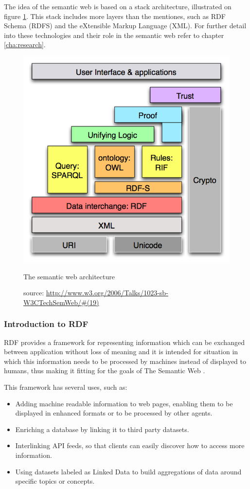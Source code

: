 The idea of the semantic web is based on a stack architecture, illustrated on figure \ref{fig:semwebstack}. This stack includes more layers than the mentiones, such as RDF Schema (RDFS) and the eXtensible Markup Language (XML). For further detail into these technologies and their role in the semantic web refer to chapter \ref{cha:research}.

\begin{figure}[ht]
  \centering
  \includegraphics[width=.5\textwidth]{fig/semwebstack}
  \caption{The semantic web architecture}
  \caption*{source: \url{http://www.w3.org/2006/Talks/1023-sb-W3CTechSemWeb/\#(19)}}
  \label{fig:semwebstack}
\end{figure} 

\subsubsection{Introduction to RDF}

RDF provides a framework for representing information which can be exchanged between application without loss of meaning and it is intended for situation in which this information needs to be processed by machines instead of displayed to humans, thus making it fitting for the goals of The Semantic Web  \cite{rdfprimer11}.

This framework has several uses, such as:

\begin{itemize}
	\item Adding machine readable information to web pages, enabling them to be displayed in enhanced formats or to be processed by other agents.
	\item Enriching a database by linking it to third party datasets.
	\item Interlinking API feeds, so that clients can easily discover how to access more information.
	\item Using datasets labeled as Linked Data to build aggregations of data around specific topics or concepts.
\end{itemize} 

